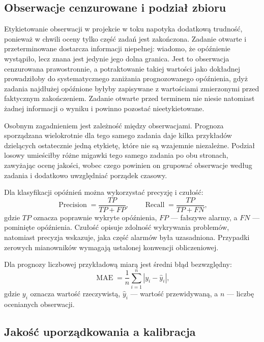 \subsection*{Obserwacje cenzurowane i podział zbioru}

Etykietowanie obserwacji w projekcie w toku napotyka dodatkową trudność, ponieważ w chwili oceny tylko część zadań jest zakończona. Zadanie otwarte i przeterminowane dostarcza informacji niepełnej: wiadomo, że opóźnienie wystąpiło, lecz znana jest jedynie jego dolna granica. Jest to obserwacja cenzurowana prawostronnie, a potraktowanie takiej wartości jako dokładnej prowadziłoby do systematycznego zaniżania prognozowanego opóźnienia, gdyż zadania najdłużej opóźnione byłyby zapisywane z wartościami zmierzonymi przed faktycznym zakończeniem. Zadanie otwarte przed terminem nie niesie natomiast żadnej informacji o wyniku i powinno pozostać nieetykietowane.

Osobnym zagadnieniem jest zależność między obserwacjami. Prognoza sporządzana wielokrotnie dla tego samego zadania daje kilka przykładów dzielących ostatecznie jedną etykietę, które nie są wzajemnie niezależne. Podział losowy umieściłby różne migawki tego samego zadania po obu stronach, zawyżając ocenę jakości, wobec czego powinien on grupować obserwacje według zadania i dodatkowo uwzględniać porządek czasowy.

Dla klasyfikacji opóźnień można wykorzystać precyzję i czułość:
\begin{equation}
    \operatorname{Precision} = \frac{TP}{TP + FP},
    \qquad
    \operatorname{Recall} = \frac{TP}{TP + FN},
    \label{eq:precyzja-czulosc}
\end{equation}
gdzie \(TP\) oznacza poprawnie wykryte opóźnienia, \(FP\) --- fałszywe alarmy, a \(FN\) --- pominięte opóźnienia. Czułość opisuje zdolność wykrywania problemów, natomiast precyzja wskazuje, jaka część alarmów była uzasadniona. Przypadki zerowych mianowników wymagają ustalonej konwencji obliczeniowej.

Dla prognozy liczbowej przykładową miarą jest średni błąd bezwzględny:
\begin{equation}
    \operatorname{MAE} =
    \frac{1}{n}
    \sum_{i=1}^{n}
    \left|y_i - \hat{y}_i\right|,
    \label{eq:mae}
\end{equation}
gdzie \(y_i\) oznacza wartość rzeczywistą, \(\hat{y}_i\) --- wartość przewidywaną, a \(n\) --- liczbę ocenianych obserwacji.

\subsection*{Jakość uporządkowania a kalibracja}

